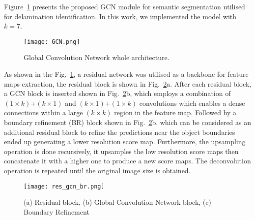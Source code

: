 Figure~\ref{fig:gcn} presents the proposed GCN module for semantic segmentation 
utilised for delamination identification.
In this work, we implemented the model with \(k=7\).
\begin{figure} [h!]
	\begin{center}
		\texttt{[image: GCN.png]}
	\end{center}
	\caption{Global Convolution Network whole architecture.} 
	\label{fig:gcn}
\end{figure}
As shown in the Fig.~\ref{fig:gcn}, a residual network was utilised as a backbone for 
feature maps extraction, the residual block is shown in 
Fig.~\ref{fig:res_gcn_br}a.
After each residual block, a GCN block is inserted shown in 
Fig.~\ref{fig:res_gcn_br}b, which employs a combination of \((1\times 
k)\)+\((k\times 1)\) and \((k\times 1)\)+\((1\times k)\) convolutions which 
enables a dense connections within a large \((k\times k)\) region in the 
feature map.
Followed by a boundary refinement (BR) block shown in Fig.~\ref{fig:res_gcn_br}b, which can be considered as an additional residual block to refine the predictions near the object boundaries ended up generating a lower resolution score map. 
Furthermore, the upsampling operation is done recursively, it upsamples the low 
resolution score maps then concatenate it with a higher one to produce a new 
score maps.
The deconvolution operation is repeated until the original image size is 
obtained.
\begin{figure} [h!]
	\begin{center}
		\texttt{[image: res\_gcn\_br.png]}
	\end{center}
	\caption{(a) Residual block, (b) Global Convolution Network block, (c) 
		Boundary Refinement} 
	\label{fig:res_gcn_br}
\end{figure}


